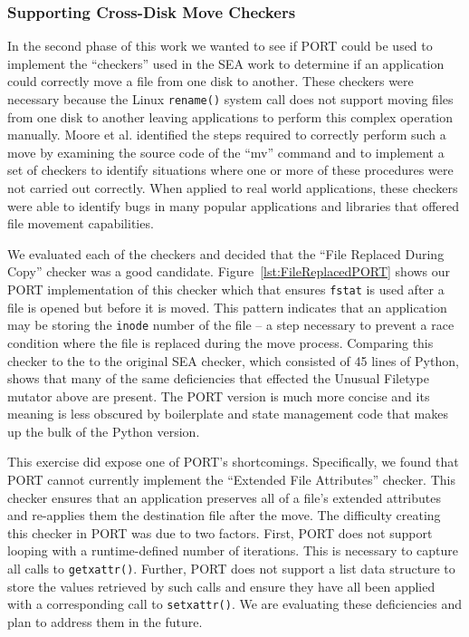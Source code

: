 \subsubsection{Supporting Cross-Disk Move Checkers}

In the second phase of this work we wanted to see if PORT could be used to
implement the ``checkers'' used in the SEA work to determine if an
application could correctly move  a file from one disk to another.
These checkers were necessary because the Linux
{\tt rename()} system call does not support moving files from one disk to
another leaving
applications to perform this complex
operation manually.
Moore et al.
identified the steps required to
correctly perform such a move by examining the source code of the ``mv''
command and
to implement a set of checkers to identify situations where one
or more of these procedures were not carried out correctly.
When applied to real world applications,
these checkers were able to identify bugs
in many popular applications and libraries that offered file movement
capabilities.

We evaluated each of the checkers and decided that the ``File Replaced
During Copy'' checker was a good candidate.
Figure~\ref{lst:FileReplacedPORT} shows our PORT implementation of this
checker which
that ensures {\tt fstat} is used after a file is opened but
before it is moved.  This pattern indicates that an application may be
storing the {\tt inode} number of the file -- a step necessary to prevent a race
condition where the file is replaced during the move process.
Comparing this checker to the
to the original SEA checker,
which consisted of 45 lines of Python,
shows that many of the same deficiencies that effected the Unusual Filetype
mutator above are present.
The PORT version is much more concise and its meaning is
less obscured by boilerplate and state management code that makes up the
bulk of the Python version.

This exercise did expose one of PORT's shortcomings.  Specifically,
we found that PORT cannot currently implement the ``Extended File
Attributes'' checker.
This checker ensures that an application
preserves all of a file's extended attributes and re-applies them the
destination file after the move.
The difficulty creating this checker
in PORT was due to two factors.
First, PORT does not support looping with a
runtime-defined number of iterations.  This is necessary to capture all
calls to {\tt getxattr()}.
Further, PORT does not support a list data structure to store the values
retrieved by such calls and ensure they have all been applied with a
corresponding call to {\tt setxattr()}.
We are evaluating these deficiencies and plan to address them in the
future.

